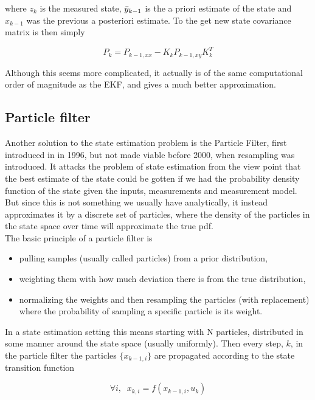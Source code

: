where $z_k$ is the measured state, $\Bar{y}_{k-1}$ is the a priori estimate of the state and $x_{k-1}$ was the previous a posteriori estimate. To the get new state covariance matrix is then simply

\begin{equation}
    P_k = P_{k-1,xx} - K_kP_{k-1,xy}K_k^T
\end{equation}

Although this seems more complicated, it actually is of the same computational order of magnitude as the EKF, and gives a much better approximation.

\subsection{Particle filter}
Another solution to the state estimation problem is the Particle Filter, first introduced in \cite{ParticleFilter} in 1996, but not made viable before 2000, when resampling was introduced\cite{ParticleResampling}. It attacks the problem of state estimation from the view point that the best estimate of the state could be gotten if we had the probability density function of the state given the inputs, measurements and measurement model. But since this is not something we usually have analytically, it instead approximates it by a discrete set of particles, where the density of the particles in the state space over time will approximate the true pdf. \\

The basic principle of a particle filter is 

\begin{itemize}
    \item pulling samples (usually called particles) from a prior distribution, 
    \item weighting them with how much deviation there is from the true distribution, 
    \item normalizing the weights and then resampling the particles (with replacement) where the probability of sampling a specific particle is its weight. 
\end{itemize}

In a state estimation setting this means starting with N particles, distributed in some manner around the state space (usually uniformly). Then every step, $k$, in the particle filter the particles $\{x_{k-1,i}\}$ are propagated according to the state transition function

\begin{equation}
\forall i, \; \; x_{k,i} = f(x_{k-1,i}, u_k)
\end{equation}


